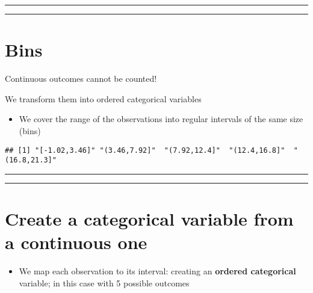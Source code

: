 \documentclass[
]{book}
\providecommand{\tightlist}{%
  \setlength{\itemsep}{0pt}\setlength{\parskip}{0pt}}
\begin{document}
\begin{center}\rule{0.5\linewidth}{0.5pt}\end{center}

\begin{center}\rule{0.5\linewidth}{0.5pt}\end{center}

\hypertarget{bins}{%
\section{Bins}\label{bins}}

Continuous outcomes cannot be counted!

We transform them into ordered categorical variables

\begin{itemize}
\tightlist
\item
  We cover the range of the observations into regular intervals of the same size (bins)
\end{itemize}

\begin{verbatim}
## [1] "[-1.02,3.46]" "(3.46,7.92]"  "(7.92,12.4]"  "(12.4,16.8]"  "(16.8,21.3]"
\end{verbatim}

\begin{center}\rule{0.5\linewidth}{0.5pt}\end{center}

\begin{center}\rule{0.5\linewidth}{0.5pt}\end{center}

\hypertarget{create-a-categorical-variable-from-a-continuous-one}{%
\section{Create a categorical variable from a continuous one}\label{create-a-categorical-variable-from-a-continuous-one}}

\begin{itemize}
\tightlist
\item
  We map each observation to its interval: creating an \textbf{ordered categorical} variable; in this case with 5 possible outcomes
\end{itemize}
\end{document}
